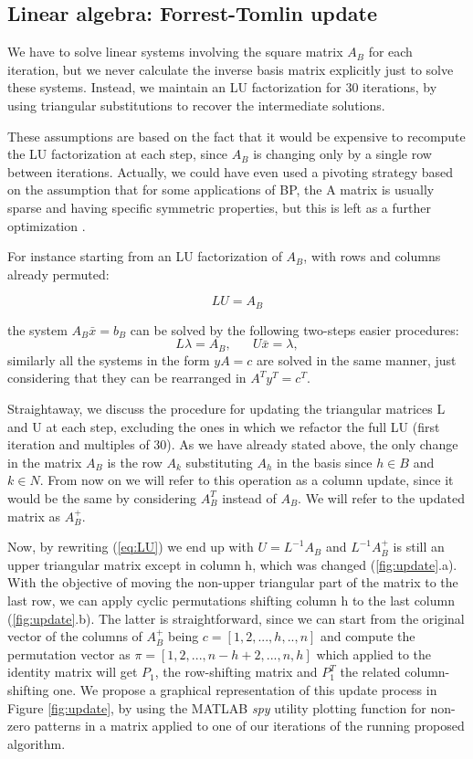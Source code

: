 \documentclass[journal,article,submit,electronics,pdftex]{Definitions/mdpi}
\begin{document}
{\subsection{Linear algebra: Forrest-Tomlin update}
We have to solve linear systems involving the square matrix $A_B$ for each iteration, but we 
never calculate the inverse basis matrix explicitly just to solve these systems. 
Instead, we maintain an LU factorization for 30 iterations, by using triangular substitutions to recover the intermediate solutions. 

These assumptions are based on the fact that it would be expensive to recompute the LU factorization at each step, since $A_B$ is changing only by a single row between iterations. Actually, we could have even used a pivoting strategy based on the assumption that for some applications of BP, the A matrix is usually sparse and having specific symmetric properties, but this is left as a further optimization \cite{num_optimization}.

For instance starting from an LU factorization of $A_B$, with rows and columns already permuted:

\begin{equation} \label{eq:LU}
LU = A_B    
\end{equation}

the system $A_B \bar{x} = b_B$ can be solved by the following two-steps easier procedures:
\begin{equation}
L\lambda = A_B , \hspace{20pt} U \bar{x} = \lambda,
\end{equation}
similarly all the systems in the form $yA=c$ are solved in the same manner, just considering that they can be rearranged in $A^Ty^T = c^T$. 

Straightaway, we discuss the procedure for updating the triangular matrices L and U at each step, excluding the ones in which we refactor the full LU (first iteration and multiples of 30). As we have already stated above, the only change in the matrix $A_B$ is the row $A_k$ substituting $A_h$ in the basis since $h\in B$ and $k\in N$. From now on we will refer to this operation as a column update, since it would be the same by considering $A_B^T$ instead of $A_B$. We will refer to the updated matrix as $A_B^+$. 

Now, by rewriting (\ref{eq:LU}) we end up with $U = L^{-1}A_B$ and $L^{-1}A_B^+$ is still an upper triangular matrix except in column h, which was changed (\ref{fig:update}.a). With the objective of moving the non-upper triangular part of the matrix to the last row, we can apply cyclic permutations shifting column h to the last column (\ref{fig:update}.b). The latter is straightforward, since we can start from the original vector of the columns of $A_B^+$ being $c = [1,2,...,h,..,n]$ and compute the permutation vector as $\pi = [1,2,...,n-h+2,...,n,h]$ which applied to the identity matrix will get $P_1$, the row-shifting matrix and $P_1^T$ the related column-shifting one. We propose a graphical representation of this update process in Figure \ref{fig:update}, by using the MATLAB \emph{spy} utility plotting function for non-zero patterns in a matrix applied to one of our iterations of the running proposed algorithm.

}
\end{document}
